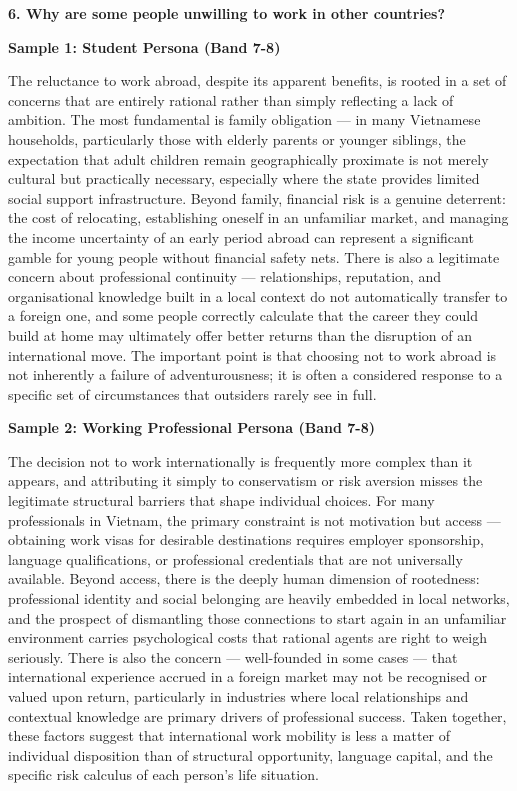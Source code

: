 \separator

\begin{ieltsquestion}
\textbf{6. Why are some people unwilling to work in other countries?}
\end{ieltsquestion}
\textbf{Sample 1: Student Persona (Band 7-8)}

The reluctance to work abroad, despite its apparent benefits, is rooted in a set of concerns that are entirely rational rather than simply reflecting a lack of ambition. The most fundamental is family obligation — in many Vietnamese households, particularly those with elderly parents or younger siblings, the expectation that adult children remain geographically proximate is not merely cultural but practically necessary, especially where the state provides limited social support infrastructure. Beyond family, financial risk is a genuine deterrent: the cost of relocating, establishing oneself in an unfamiliar market, and managing the income uncertainty of an early period abroad can represent a significant gamble for young people without financial safety nets. There is also a legitimate concern about professional continuity — relationships, reputation, and organisational knowledge built in a local context do not automatically transfer to a foreign one, and some people correctly calculate that the career they could build at home may ultimately offer better returns than the disruption of an international move. The important point is that choosing not to work abroad is not inherently a failure of adventurousness; it is often a considered response to a specific set of circumstances that outsiders rarely see in full.

\textbf{Sample 2: Working Professional Persona (Band 7-8)}

The decision not to work internationally is frequently more complex than it appears, and attributing it simply to conservatism or risk aversion misses the legitimate structural barriers that shape individual choices. For many professionals in Vietnam, the primary constraint is not motivation but access — obtaining work visas for desirable destinations requires employer sponsorship, language qualifications, or professional credentials that are not universally available. Beyond access, there is the deeply human dimension of rootedness: professional identity and social belonging are heavily embedded in local networks, and the prospect of dismantling those connections to start again in an unfamiliar environment carries psychological costs that rational agents are right to weigh seriously. There is also the concern — well-founded in some cases — that international experience accrued in a foreign market may not be recognised or valued upon return, particularly in industries where local relationships and contextual knowledge are primary drivers of professional success. Taken together, these factors suggest that international work mobility is less a matter of individual disposition than of structural opportunity, language capital, and the specific risk calculus of each person's life situation.

